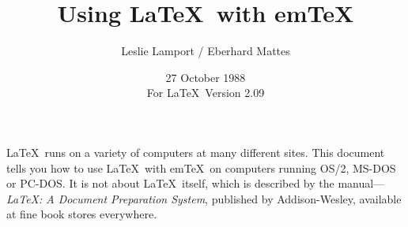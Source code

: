 %
%
%
 
 
 
\newcommand{\contact}{Eberhard Mattes}
 
\newcommand{\BibTeX}{{\rm B\kern-.05em{\sc i\kern-.025em b}\kern-.08em
    T\kern-.1667em\lower.7ex\hbox{E}\kern-.125emX}}
 
 
\newcommand\bs{\char '134 }   %
\newcommand{\lb}{\char '173 } %
\newcommand{\rb}{\char '175 } %
 
\title{Using \LaTeX\ with em\TeX}
 
\author{Leslie Lamport / Eberhard Mattes}
 
\date{27 October 1988\\              %
For \LaTeX\ Version 2.09} 
 

 
\maketitle
 
\tableofcontents
 
\newpage
 
\LaTeX\ runs on a variety of computers at many different sites.  This
document tells you how to use \LaTeX\ with em\TeX\ on computers
running OS/2, MS-DOS or PC-DOS.
It is not about \LaTeX\ itself, which is described by
the manual---{\em \LaTeX: A Document Preparation System}, published by
Addison-Wesley, available at fine book stores everywhere.
 
